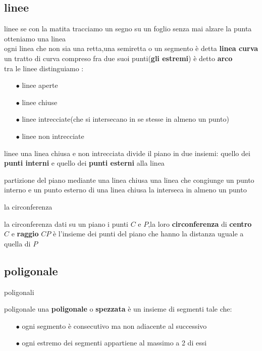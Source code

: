 \documentclass{beamer}
\begin{document}
\subsection{linee}
\begin{frame}{linee}
    se con la matita tracciamo un segno su un foglio senza mai alzare la punta otteniamo una linea\\
    ogni linea che non sia una retta,una semiretta o un segmento è detta \textbf{linea curva}\\
    un tratto di curva compreso fra due suoi punti(\textbf{gli estremi}) è detto \textbf{arco} \\
    tra le linee distinguiamo :
    \begin{itemize}
        \item[$\bullet$] linee aperte
        \item[$\bullet$] linee chiuse
        \item[$\bullet$] linee intrecciate(che si intersecano in se stesse in almeno un punto)
        \item[$\bullet$] linee non intrecciate
    \end{itemize}
\end{frame}
\begin{frame}{linee}
    una linea chiusa e non intrecciata divide il piano in due insiemi: quello dei \textbf{punti interni} e quello dei \textbf{punti esterni} alla linea
    \begin{block}{partizione del piano mediante una linea chiusa}
    una linea che congiunge un punto interno e un punto esterno di una linea chiusa la interseca in almeno un punto
    \end{block}
    \end{frame}
    \begin{frame}{la circonferenza}
    \begin{block}{la circonferenza}
    dati su un piano i punti $C$ e $P$,la loro \textbf{circonferenza} di \textbf{centro} $C$ e \textbf{raggio} $CP$ è l'insieme dei punti del piano che hanno la distanza uguale a quella di $P$
    \end{block}
\end{frame}
    \subsection{poligonale}
    \begin{frame}{poligonali}
    \begin{block}{poligonale}
   una \textbf{poligonale} o \textbf{spezzata} è un insieme di segmenti tale che:
   \begin{enumerate}
       \item[$\bullet$] ogni segmento è consecutivo ma non adiacente al successivo
       \item[$\bullet$] ogni estremo dei segmenti appartiene al massimo a 2 di essi
   \end{enumerate}
    \end{block}
\end{frame}
\end{document}
